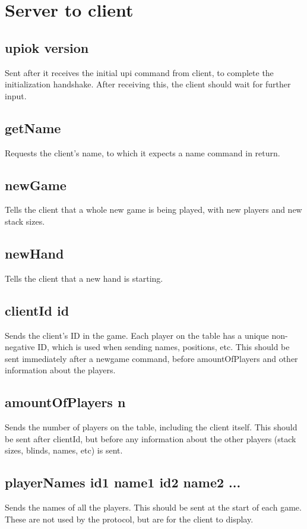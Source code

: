 \documentclass{article}
\begin{document}
\section{Server to client}

\subsection*{upiok \textlangle{}version\textrangle{}}
Sent after it receives the initial upi command from client, to complete the initialization handshake. After receiving this, the client should wait for further input.

\subsection*{getName}
Requests the client's name, to which it expects a name command in return.

\subsection*{newGame}
Tells the client that a whole new game is being played, with new players and new stack sizes. 

\subsection*{newHand}
Tells the client that a new hand is starting.

\subsection*{clientId \textlangle{}id\textrangle{}}
Sends the client's ID in the game. Each player on the table has a unique non-negative ID, which is used when sending names, positions, etc. This should be sent immediately after a newgame command, before amountOfPlayers and other information about the players.

\subsection*{amountOfPlayers \textlangle{}n\textrangle{}}
Sends the number of players on the table, including the client itself. This should be sent after clientId, but before any information about the other players (stack sizes, blinds, names, etc) is sent.

\subsection*{playerNames \textlangle{}id1 name1\textrangle{} \textlangle{}id2 name2\textrangle{} ... }
Sends the names of all the players. This should be sent at the start of each game. These are not used by the protocol, but are for the client to display.
\end{document}
